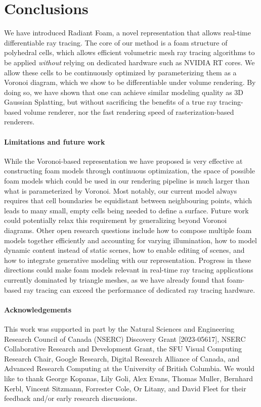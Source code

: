 \section{Conclusions}
% 
We have introduced Radiant Foam, a novel representation that allows real-time differentiable ray tracing.
The core of our method is a foam structure of polyhedral cells, which allows efficient volumetric mesh ray tracing algorithms to be applied \textit{without} relying on dedicated hardware such as NVIDIA RT cores.
We allow these cells to be continuously optimized by parameterizing them as a Voronoi diagram, which we show to be differentiable under volume rendering.
By doing so, we have shown that one can achieve similar modeling quality as 3D Gaussian Splatting, but without sacrificing the benefits of a true ray tracing-based volume renderer, nor the fast rendering speed of rasterization-based renderers.

\paragraph{Limitations and future work}
While the Voronoi-based representation we have proposed is very effective at constructing foam models through continuous optimization, the space of possible foam models which could be used in our rendering pipeline is much larger than what is parameterized by Voronoi.
Most notably, our current model always requires that cell boundaries be equidistant between neighbouring points, which leads to many small, empty cells being needed to define a surface.
Future work could potentially relax this requirement by generalizing beyond Voronoi diagrams.
\quad
Other open research questions include how to compose multiple foam models together efficiently and accounting for varying illumination, how to model dynamic content instead of static scenes, how to enable editing of scenes, and how to integrate generative modeling with our representation.
Progress in these directions could make foam models relevant in real-time ray tracing applications currently dominated by triangle meshes, as we have already found that foam-based ray tracing can exceed the performance of dedicated ray tracing hardware.

\paragraph{Acknowledgements}
%
This work was supported in part by the Natural Sciences and Engineering Research Council of Canada (NSERC) Discovery Grant [2023-05617], NSERC Collaborative Research and Development Grant, the SFU Visual Computing Research Chair, Google Research, Digital Research Alliance of Canada, and Advanced Research Computing at the University of British Columbia.
\quad
We would like to thank George Kopanas, Lily Goli, Alex Evans, Thomas Muller, Bernhard Kerbl, Vincent Sitzmann, Forrester Cole, Or Litany, and David Fleet for their feedback and/or early research discussions.
